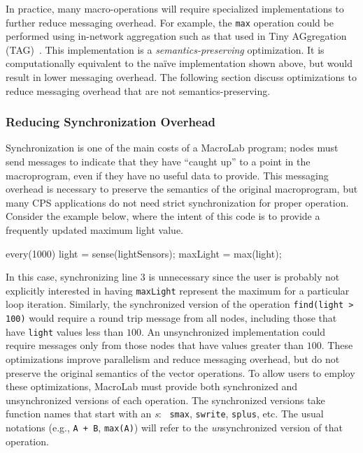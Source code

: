In practice, many macro-operations will require specialized
implementations to further reduce messaging overhead.  For example,
the {\tt max} operation could be performed using in-network
aggregation such as that used in Tiny AGgregation
(TAG)~\cite{Madden2002}.  This implementation is a {\em
  semantics-preserving} optimization. It is computationally equivalent
to the na\"{i}ve implementation shown above, but would result in lower
messaging overhead. The following section discuss
optimizations to reduce messaging overhead that are not
semantics-preserving.

\subsubsection{Reducing Synchronization Overhead}

Synchronization is one of the main costs of a MacroLab program; nodes
must send messages to indicate that they have ``caught up'' to a point
in the macroprogram, even if they have no useful data to provide.
This messaging overhead is necessary to preserve the semantics of the
original macroprogram, but many CPS applications do not need strict
synchronization for proper operation.  Consider the example below,
where the intent of this code is to provide a frequently updated
maximum light value.

\begin{macrolab}
every(1000) {
  light = sense(lightSensors);
  maxLight = max(light);
}
\end{macrolab}

\noindent In this case, synchronizing line 3 is unnecessary since the user is
probably not explicitly interested in having {\tt maxLight} represent the
maximum for a particular loop iteration.  Similarly, the synchronized version of
the operation {\tt find(light > 100)} would require a round trip message from
all nodes, including those that have {\tt light} values less than $100$.  An
unsynchronized implementation could require messages only from those nodes that
have values greater than $100$.  These optimizations improve parallelism and
reduce messaging overhead, but do not preserve the original semantics of the
vector operations.  To allow users to employ these optimizations, MacroLab must
provide both synchronized and unsynchronized versions of each operation. The
synchronized versions take function names that start with an \emph{s}: {\tt
smax}, {\tt swrite}, {\tt splus}, etc. The usual notations (e.g., {\tt A + B},
{\tt max(A)}) will refer to the \emph{un}synchronized version of that operation.

